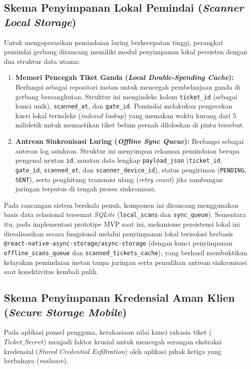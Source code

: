 \subsection{Skema Penyimpanan Lokal Pemindai (\textit{Scanner Local Storage})}
Untuk mengoperasikan pemindaian luring berkecepatan tinggi, perangkat pemindai gerbang dirancang memiliki modul penyimpanan lokal persisten dengan dua struktur data utama:
\begin{enumerate}
    \item \textbf{Memori Pencegah Tiket Ganda (\textit{Local Double-Spending Cache}):} Berfungsi sebagai repositori instan untuk mencegah pembelanjaan ganda di gerbang bersangkutan. Struktur ini mengindeks kolom \texttt{ticket\_id} (sebagai kunci unik), \texttt{scanned\_at}, dan \texttt{gate\_id}. Pemindai melakukan pengecekan kueri lokal terindeks (\textit{indexed lookup}) yang memakan waktu kurang dari 5 milidetik untuk memastikan tiket belum pernah diloloskan di pintu tersebut.
    \item \textbf{Antrean Sinkronisasi Luring (\textit{Offline Sync Queue}):} Berfungsi sebagai antrean log asinkron. Struktur ini menyimpan rekaman pemindaian berupa pengenal urutan \texttt{id}, muatan data lengkap \texttt{payload\_json} (\texttt{ticket\_id}, \texttt{gate\_id}, \texttt{scanned\_at}, dan \texttt{scanner\_device\_id}), status pengiriman (\texttt{PENDING}, \texttt{SENT}), serta penghitung transmisi ulang (\textit{retry count}) jika sambungan jaringan terputus di tengah proses sinkronisasi.
\end{enumerate}

Pada rancangan sistem berskala penuh, komponen ini dirancang menggunakan basis data relasional tersemat \textit{SQLite} (\texttt{local\_scans} dan \texttt{sync\_queue}). Sementara itu, pada implementasi prototipe MVP saat ini, mekanisme persistensi lokal ini direalisasikan secara fungsional melalui penyimpanan lokal terisolasi berbasis \texttt{@react-native-async-storage/async-storage} (dengan kunci penyimpanan \texttt{offline\_scans\_queue} dan \texttt{scanned\_tickets\_cache}), yang berhasil membuktikan kelayakan pemindaian instan tanpa jaringan serta pemulihan antrean sinkronisasi saat konektivitas kembali pulih.

\subsection{Skema Penyimpanan Kredensial Aman Klien (\textit{Secure Storage Mobile})}
Pada aplikasi ponsel pengguna, kerahasiaan nilai kunci rahasia tiket ($Ticket\_Secret$) menjadi faktor krusial untuk mencegah serangan ekstraksi kredensial (\textit{Stored Credential Exfiltration}) oleh aplikasi pihak ketiga yang berbahaya (\textit{malware}).

